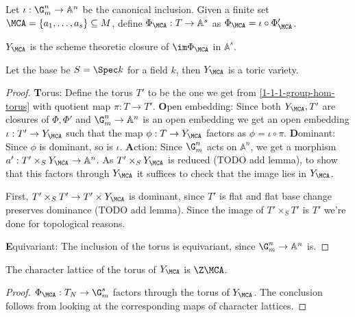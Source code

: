 \begin{definition}
  \label{1-1-phiA}

  Let $\iota : \G_m^n \to \mathbb{A}^n$ be the canonical inclusion.
  Given a finite set $\MCA = \{a_1, \dotsc, a_s\} \subseteq M$,
  define $\Phi_\MCA : T \to \mathbb{A}^s$ as $\Phi_{\MCA}=\iota\circ\Phi'_{\MCA}$.
\end{definition}


\begin{definition}
  \label{1-1-7-ya}

  $Y_\MCA$ is the scheme theoretic closure of $\im \Phi_\MCA$ in $\mathbb A^s$.
\end{definition}


\begin{proposition}
  \label{1-1-8-aff-tor-var-ya}

  Let the base be $S=\Spec k$ for a field $k$, then $Y_\MCA$ is a toric variety.
\end{proposition}
\begin{proof}

  {\textbf Torus: }
  Define the torus $T'$ to be the one we get from \ref{1-1-1-group-hom-torus} with quotient map $\pi:T \to T'$.
  {\textbf Open embedding: }
  Since both $Y_{\MCA},T'$ are closures of $\Phi,\Phi'$ and $\G_m^n\to\mathbb{A}^n$ is an open embedding
  we get an open embedding $\iota:T' \to Y_{\MCA}$ such that the map $\phi:T \to Y_{\MCA}$ factors as
  $\phi = \iota \circ \pi$.
  {\textbf Dominant: } Since $\phi$ is dominant, so is $\iota$.
  {\textbf Action: }
  Since $\G_m^n$ acts on $\mathbb{A}^n$, we get a morphism $a':T' \times_S Y_\MCA \to \mathbb{A}^n$.
  As $T'\times_S Y_\MCA$ is reduced (TODO add lemma), to show that this factors through $Y_\MCA$ it suffices to check
  that the image lies in $Y_\MCA$.

  First, $T'\times_S T' \to T'\times Y_\MCA$ is dominant, since $T'$ is flat and flat base change preserves dominance (TODO add lemma).
  Since the image of $T'\times_S T'$ is $T'$ we're done for topological reasons.

  {\textbf Equivariant: } The inclusion of the torus is equivariant, since $\G_m^n \to \mathbb{A}^n$ is.
\end{proof}

\begin{proposition}
  \label{1-1-8-char-ya}

  The character lattice of the torus of $Y_\MCA$ is $\Z \MCA$.
\end{proposition}
\begin{proof}

  $\Phi_\MCA: T_N \to \G_m^s$ factors through the torus of $Y_\MCA$.
  The conclusion follows from looking at the corresponding maps of character lattices.
\end{proof}

